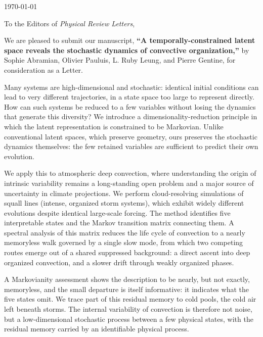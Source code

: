 \documentclass[11pt]{article}
\begin{document}
\noindent\today

\medskip
\noindent To the Editors of \emph{Physical Review Letters},

\medskip
\noindent We are pleased to submit our manuscript, \textbf{``A temporally-constrained latent space reveals the stochastic dynamics of convective organization,''} by Sophie Abramian, Olivier Pauluis, L. Ruby Leung, and Pierre Gentine, for consideration as a Letter.

Many systems are high-dimensional and stochastic: identical initial conditions can lead to very different trajectories, in a state space too large to represent directly. How can such systems be reduced to a few variables without losing the dynamics that generate this diversity? We introduce a dimensionality-reduction principle in which the latent representation is constrained to be Markovian. Unlike conventional latent spaces, which preserve geometry, ours preserves the stochastic dynamics themselves: the few retained variables are sufficient to predict their own evolution. %

We apply this to atmospheric deep convection, where understanding the origin of intrinsic variability remains a long-standing open problem and a major source of uncertainty in climate projections. We perform cloud-resolving simulations of squall lines (intense, organized storm systems), which exhibit widely different evolutions despite identical large-scale forcing. The method identifies five interpretable states and the Markov transition matrix connecting them. A spectral analysis of this matrix reduces the life cycle of convection to a nearly memoryless walk governed by a single slow mode, from which two competing routes emerge out of a shared suppressed background: a direct ascent into deep organized convection, and a slower drift through weakly organized phases.

A Markovianity assessment shows the description to be nearly, but not exactly, memoryless, and the small departure is itself informative: it indicates what the five states omit. We trace part of this residual memory to cold pools, the cold air left beneath storms. The internal variability of convection is therefore not noise, but a low-dimensional stochastic process between a few physical states, with the residual memory carried by an identifiable physical process.
\end{document}
